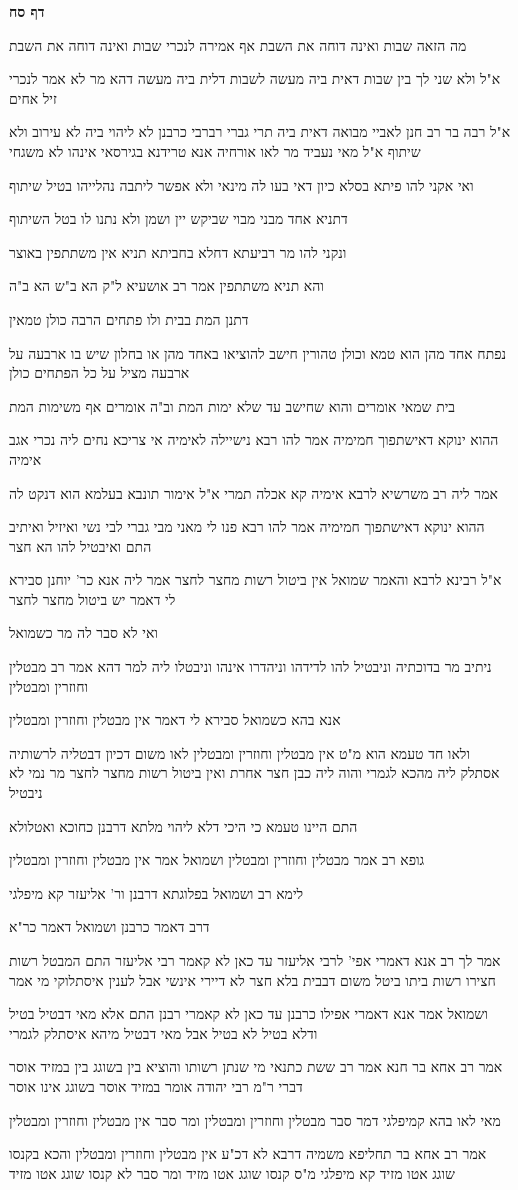 \documentclass[12pt, openany]{book}
\newcommand{\sethebfont}{
\fontsize{10.5pt}{21.0pt} \selectfont
}
\newcommand{\textblock}[1]{
{\sethebfont #1\\}	
}
\newcommand{\sectname}{}
\newcommand{\newsection}[1]{
	\addcontentsline{toc}{section}{#1}
	\renewcommand{\sectname}{#1}	
	\vspace{-\baselineskip}
	\begin{center}
		\textbf{%
\fontsize{16pt}{16pt}\selectfont
			#1}
	\end{center}
	\vspace{-\baselineskip}
	\nopagebreak
}
\begin{document}
\newsection{דף סח}
\textblock{מה הזאה שבות ואינה דוחה את השבת אף אמירה לנכרי שבות ואינה דוחה את השבת}
\textblock{א"ל ולא שני לך בין שבות דאית ביה מעשה לשבות דלית ביה מעשה דהא מר לא אמר לנכרי זיל אחים}
\textblock{א"ל רבה בר רב חנן לאביי מבואה דאית ביה תרי גברי רברבי כרבנן לא ליהוי ביה לא עירוב ולא שיתוף א"ל מאי נעביד מר לאו אורחיה אנא טרידנא בגירסאי אינהו לא משגחי}
\textblock{ואי אקני להו פיתא בסלא כיון דאי בעו לה מינאי ולא אפשר ליתבה נהלייהו בטיל שיתוף}
\textblock{דתניא אחד מבני מבוי שביקש יין ושמן ולא נתנו לו בטל השיתוף}
\textblock{ונקני להו מר רביעתא דחלא בחביתא תניא אין משתתפין באוצר}
\textblock{והא תניא משתתפין אמר רב אושעיא ל"ק הא ב"ש הא ב"ה}
\textblock{דתנן המת בבית ולו פתחים הרבה כולן טמאין}
\textblock{נפתח אחד מהן הוא טמא וכולן טהורין חישב להוציאו באחד מהן או בחלון שיש בו ארבעה על ארבעה מציל על כל הפתחים כולן}
\textblock{בית שמאי אומרים והוא שחישב עד שלא ימות המת וב"ה אומרים אף משימות המת}
\textblock{ההוא ינוקא דאישתפוך חמימיה אמר להו רבא נישיילה לאימיה אי צריכא נחים ליה נכרי אגב אימיה}
\textblock{אמר ליה רב משרשיא לרבא אימיה קא אכלה תמרי א"ל אימור תונבא בעלמא הוא דנקט לה}
\textblock{ההוא ינוקא דאישתפוך חמימיה אמר להו רבא פנו לי מאני מבי גברי לבי נשי ואיזיל ואיתיב התם ואיבטיל להו הא חצר}
\textblock{א"ל רבינא לרבא והאמר שמואל אין ביטול רשות מחצר לחצר אמר ליה אנא כר' יוחנן סבירא לי דאמר יש ביטול מחצר לחצר}
\textblock{ואי לא סבר לה מר כשמואל}
\textblock{ניתיב מר בדוכתיה וניבטיל להו לדידהו וניהדרו אינהו וניבטלו ליה למר דהא אמר רב מבטלין וחוזרין ומבטלין}
\textblock{אנא בהא כשמואל סבירא לי דאמר אין מבטלין וחוזרין ומבטלין}
\textblock{ולאו חד טעמא הוא מ"ט אין מבטלין וחוזרין ומבטלין לאו משום דכיון דבטליה לרשותיה אסתלק ליה מהכא לגמרי והוה ליה כבן חצר אחרת ואין ביטול רשות מחצר לחצר מר נמי לא ניבטיל}
\textblock{התם היינו טעמא כי היכי דלא ליהוי מלתא דרבנן כחוכא ואטלולא}
\textblock{גופא רב אמר מבטלין וחוזרין ומבטלין ושמואל אמר אין מבטלין וחוזרין ומבטלין}
\textblock{לימא רב ושמואל בפלוגתא דרבנן ור' אליעזר קא מיפלגי}
\textblock{דרב דאמר כרבנן ושמואל דאמר כר"א}
\textblock{אמר לך רב אנא דאמרי אפי' לרבי אליעזר עד כאן לא קאמר רבי אליעזר התם המבטל רשות חצירו רשות ביתו ביטל משום דבבית בלא חצר לא דיירי אינשי אבל לענין איסתלוקי מי אמר}
\textblock{ושמואל אמר אנא דאמרי אפילו כרבנן עד כאן לא קאמרי רבנן התם אלא מאי דבטיל בטיל ודלא בטיל לא בטיל אבל מאי דבטיל מיהא איסתלק לגמרי}
\textblock{אמר רב אחא בר חנא אמר רב ששת כתנאי מי שנתן רשותו והוציא בין בשוגג בין במזיד אוסר דברי ר"מ רבי יהודה אומר במזיד אוסר בשוגג אינו אוסר}
\textblock{מאי לאו בהא קמיפלגי דמר סבר מבטלין וחוזרין ומבטלין ומר סבר אין מבטלין וחוזרין ומבטלין}
\textblock{אמר רב אחא בר תחליפא משמיה דרבא לא דכ"ע אין מבטלין וחוזרין ומבטלין והכא בקנסו שוגג אטו מזיד קא מיפלגי מ"ס קנסו שוגג אטו מזיד ומר סבר לא קנסו שוגג אטו מזיד}
\end{document}
